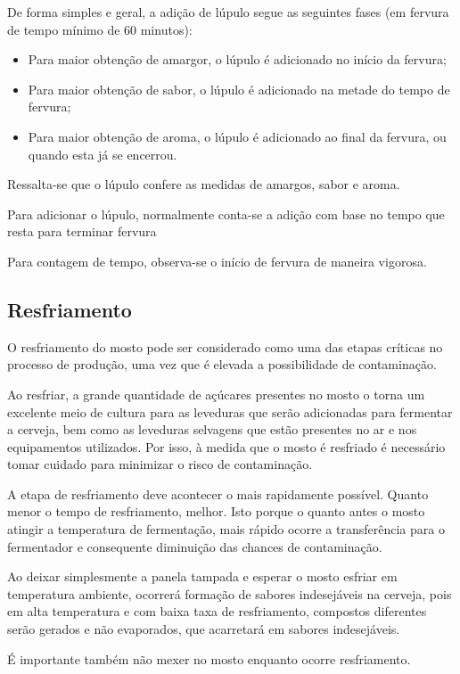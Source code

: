 De forma simples e geral, a adição de lúpulo segue as seguintes fases (em fervura de tempo mínimo de 60 minutos):

\begin{itemize}
    \item Para maior obtenção de amargor, o lúpulo é adicionado no início da fervura;
    \item Para maior obtenção de sabor, o lúpulo é adicionado na metade do tempo de fervura;
    \item Para maior obtenção de aroma, o lúpulo é adicionado ao final da fervura, ou quando esta já se encerrou.
\end{itemize}

Ressalta-se que o lúpulo confere as medidas de amargos, sabor e aroma.

Para adicionar o lúpulo, normalmente conta-se a adição com base no tempo que resta para terminar fervura

Para contagem de tempo, observa-se o início de fervura de maneira vigorosa.

\subsection{Resfriamento}

O resfriamento do mosto pode ser considerado como uma das etapas críticas no processo de produção, uma vez que é elevada a possibilidade de contaminação.

Ao resfriar, a grande quantidade de açúcares presentes no mosto o torna um excelente meio de cultura para as leveduras que serão adicionadas para fermentar a cerveja, bem como as leveduras selvagens que estão presentes no ar e nos equipamentos utilizados. Por isso, à medida que o mosto é resfriado é necessário tomar cuidado para minimizar o risco de contaminação.

A etapa de resfriamento deve acontecer o mais rapidamente possível. Quanto menor o tempo de resfriamento, melhor. Isto porque o quanto antes o mosto atingir a temperatura de fermentação, mais rápido ocorre a transferência para o fermentador e consequente diminuição das chances de contaminação.

Ao deixar simplesmente a panela tampada e esperar o mosto esfriar em temperatura ambiente, ocorrerá formação de sabores indesejáveis na cerveja, pois em alta temperatura e com baixa taxa de resfriamento, compostos diferentes serão gerados e não evaporados, que acarretará em sabores indesejáveis.

É importante também não mexer no mosto enquanto ocorre resfriamento.

